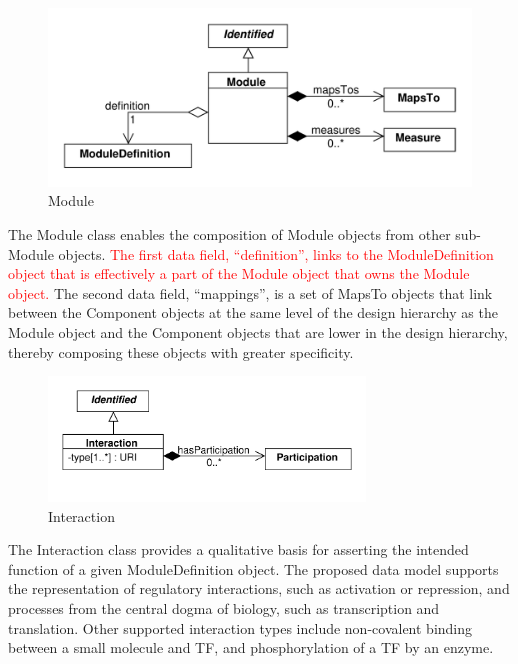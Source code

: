 \documentclass[draftspec]{sbmlpkgspec}
\begin{document}
\begin{figure}[h]
\begin{center}
\includegraphics[width=\textwidth]{uml/module}
\caption[]{Module}
\label{uml:module}
\end{center}
\end{figure}

The Module class enables the composition of Module objects from other sub-Module objects. \textcolor{red}{The first data field, “definition”, links to the ModuleDefinition object that is effectively a part of the Module object that owns the Module object.} The second data field, “mappings”, is a set of MapsTo objects that link between the Component objects at the same level of the design hierarchy as the Module object and the Component objects that are lower in the design hierarchy, thereby composing these objects with greater specificity.

\begin{figure}[h]
\begin{center}
\includegraphics[width=0.75\textwidth]{uml/interaction}
\caption[]{Interaction}
\label{uml:interaction}
\end{center}
\end{figure}

The Interaction class provides a qualitative basis for asserting the intended function of a given ModuleDefinition object. The proposed data model supports the representation of regulatory interactions, such as activation or repression, and processes from the central dogma of biology, such as transcription and translation. Other supported interaction types include non-covalent binding between a small molecule and TF, and phosphorylation of a TF by an enzyme. 
\end{document}
